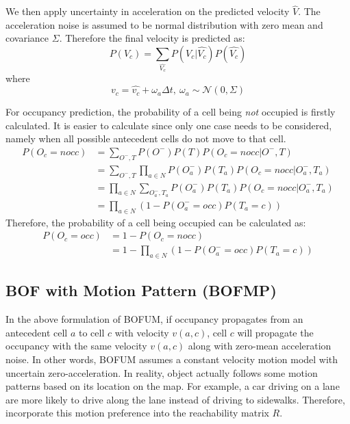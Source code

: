 We then apply uncertainty in acceleration on the predicted velocity $\hat{V}$. The acceleration noise is assumed to be normal distribution with zero mean and covariance $\Sigma$. Therefore the final velocity is predicted as:
\begin{equation}
P(V_c) = \sum_{\hat{V_c}}{P(V_c|\hat{V_c})P(\hat{V_c})} \label{eq:adding_noise}
\end{equation}
where
\begin{equation}
v_c = \hat{v_c} + \omega_a \Delta t, \ \omega_a \sim \mathcal{N}(0, \Sigma) \label{eq:adding_noise}
\end{equation}

For occupancy prediction, the probability of a cell being \textit{not} occupied is firstly calculated. It is easier to calculate since only one case needs to be considered, namely when all possible antecedent cells do not move to that cell.
\begin{align}
P(O_c=nocc) &= \sum_{O^-, T} P(O^-)P(T)P(O_c=nocc|O^-,T) \\
            &= \sum_{O^-, T}\prod_{a \in N} P(O_a^-)P(T_a)P(O_c=nocc|O^-_a,T_a) \\
            &= \prod_{a \in N} \sum_{O_a^-, T_a} P(O_a^-)P(T_a)P(O_c=nocc|O^-_a,T_a) \\
            &= \prod_{a \in N} (1-P(O_a^-=occ)P(T_a=c))
\end{align}
Therefore, the probability of a cell being occupied can be calculated as:
\begin{align}
P(O_c=occ) &= 1 - P(O_c=nocc) \\
           &= 1 - \prod_{a \in N}{(1-P(O_a^-=occ)P(T_a=c))}
\end{align}

\subsection{BOF with Motion Pattern (BOFMP)} \label{sec:bofmp}

In the above formulation of BOFUM, if occupancy propagates from an antecedent cell $a$ to cell $c$ with velocity $v(a,c)$, cell $c$ will propagate the occupancy with the same velocity $v(a,c)$ along with zero-mean acceleration noise. In other words, BOFUM assumes a constant velocity motion model with uncertain zero-acceleration. In reality, object actually follows some motion patterns based on its location on the map. For example, a car driving on a lane are more likely to drive along the lane instead of driving to sidewalks. Therefore, \citet{gindele2009bayesian} incorporate this motion preference into the reachability matrix $R$.

